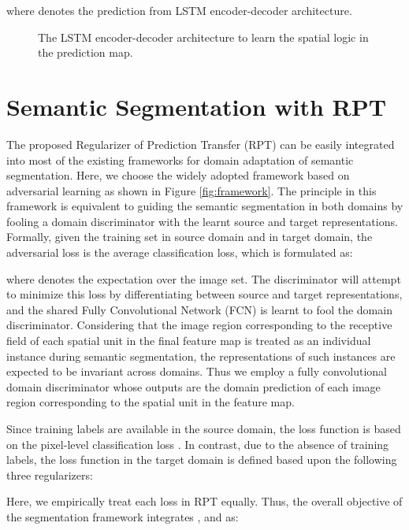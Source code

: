 \documentclass[10pt,twocolumn,letterpaper]{article}
\begin{document}
where  denotes the prediction from LSTM encoder-decoder architecture.


\begin{figure}[!tb]
   \caption{\small The LSTM encoder-decoder architecture to learn the spatial logic in the prediction map.}
   \label{fig:spatial}
   \vspace{-0.15in}
\end{figure}


\section{Semantic Segmentation with RPT}
The proposed Regularizer of Prediction Transfer (RPT) can be easily integrated into most of the existing frameworks for domain adaptation of semantic segmentation. Here, we choose the widely adopted framework based on adversarial learning as shown in Figure \ref{fig:framework}. The principle in this framework is equivalent to guiding the semantic segmentation in both domains by fooling a domain discriminator  with the learnt source and target representations. Formally, given the training set  in source domain and  in target domain, the adversarial loss  is the average classification loss, which is formulated as:

where  denotes the expectation over the image set. The discriminator  will attempt to minimize this loss by differentiating between source and target representations, and the shared Fully Convolutional Network (FCN) is learnt to fool the domain discriminator.
Considering that the image region corresponding to the receptive field of each spatial unit in the final feature map is treated as an individual instance during semantic segmentation, the representations of such instances are expected to be invariant across domains.
Thus we employ a fully convolutional domain discriminator whose outputs are the domain prediction of each image region corresponding to the spatial unit in the feature map.

Since training labels are available in the source domain, the loss function is based on the pixel-level classification loss . In contrast, due to the absence of training labels, the loss function in the target domain is defined based upon the following three regularizers:

Here, we empirically treat each loss in RPT equally. Thus, the overall objective of the segmentation framework integrates ,  and  as:
\end{document}
